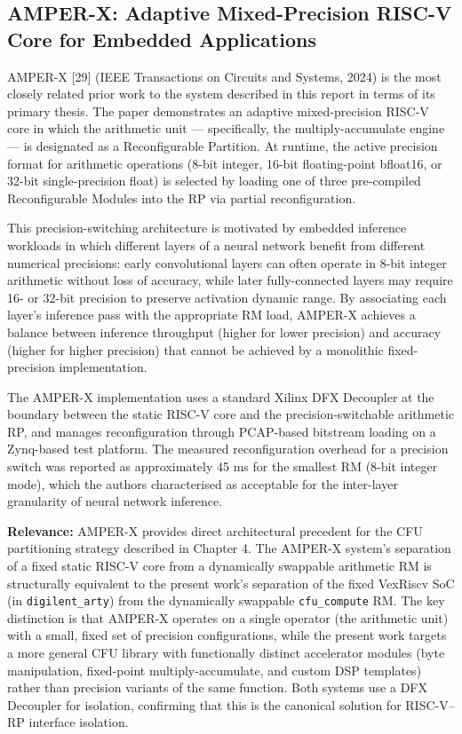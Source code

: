 \subsection{AMPER-X: Adaptive Mixed-Precision RISC-V Core for Embedded Applications}

AMPER-X [29] (IEEE Transactions on Circuits and Systems, 2024) is the most closely related prior work to the system described in this report in terms of its primary thesis. The paper demonstrates an adaptive mixed-precision RISC-V core in which the arithmetic unit — specifically, the multiply-accumulate engine — is designated as a Reconfigurable Partition. At runtime, the active precision format for arithmetic operations (8-bit integer, 16-bit floating-point bfloat16, or 32-bit single-precision float) is selected by loading one of three pre-compiled Reconfigurable Modules into the RP via partial reconfiguration.

This precision-switching architecture is motivated by embedded inference workloads in which different layers of a neural network benefit from different numerical precisions: early convolutional layers can often operate in 8-bit integer arithmetic without loss of accuracy, while later fully-connected layers may require 16- or 32-bit precision to preserve activation dynamic range. By associating each layer's inference pass with the appropriate RM load, AMPER-X achieves a balance between inference throughput (higher for lower precision) and accuracy (higher for higher precision) that cannot be achieved by a monolithic fixed-precision implementation.

The AMPER-X implementation uses a standard Xilinx DFX Decoupler at the boundary between the static RISC-V core and the precision-switchable arithmetic RP, and manages reconfiguration through PCAP-based bitstream loading on a Zynq-based test platform. The measured reconfiguration overhead for a precision switch was reported as approximately 45 ms for the smallest RM (8-bit integer mode), which the authors characterised as acceptable for the inter-layer granularity of neural network inference.

\textbf{Relevance:} AMPER-X provides direct architectural precedent for the CFU partitioning strategy described in Chapter 4. The AMPER-X system's separation of a fixed static RISC-V core from a dynamically swappable arithmetic RM is structurally equivalent to the present work's separation of the fixed VexRiscv SoC (in \texttt{digilent\_arty}) from the dynamically swappable \texttt{cfu\_compute} RM. The key distinction is that AMPER-X operates on a single operator (the arithmetic unit) with a small, fixed set of precision configurations, while the present work targets a more general CFU library with functionally distinct accelerator modules (byte manipulation, fixed-point multiply-accumulate, and custom DSP templates) rather than precision variants of the same function. Both systems use a DFX Decoupler for isolation, confirming that this is the canonical solution for RISC-V–RP interface isolation.

